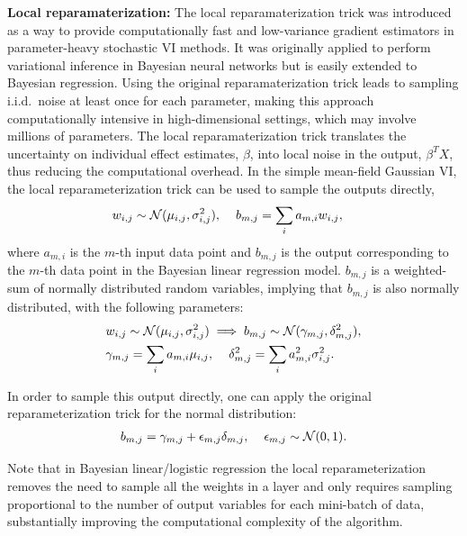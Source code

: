 \vspace{2mm}
\noindent \textbf{Local reparamaterization:} The local reparamaterization trick \cite{kingma2015variational} was introduced as a way to provide computationally fast and low-variance gradient estimators in parameter-heavy stochastic VI methods.
%
It was originally applied to perform variational inference in Bayesian neural networks but is easily extended to Bayesian regression.
%
Using the original reparamaterization trick \cite{kingma2013auto,blundell2015weight} leads to sampling i.i.d.\ noise at least once for each parameter, making this approach computationally intensive in high-dimensional settings, which may involve millions of parameters.
%
The local reparamaterization trick translates the uncertainty on individual effect estimates, $\beta$, into local noise in the output, $\beta^T X$, thus reducing the computational overhead.
%
In the simple mean-field Gaussian VI, the local reparameterization trick can be used to sample the outputs directly,
\begin{align}
   &w_{i,j} \sim \mathcal{N}(\mu_{i,j}, \sigma^2_{i,j}), \hspace{4mm} b_{m,j} =  \sum_{i} a_{m,i} w_{i,j},
\end{align}
where $a_{m,i}$ is the $m$-th input data point and $b_{m,j}$ is the output corresponding to the $m$-th data point in the Bayesian linear regression model.
%
$b_{m,j}$ is a weighted-sum of normally distributed random variables, implying that $b_{m,j}$ is also normally distributed, with the following parameters:
\begin{align}
    &w_{i,j} \sim \mathcal{N}(\mu_{i,j}, \sigma^2_{i,j}) \implies b_{m,j} \sim \mathcal{N}(\gamma_{m,j}, \delta^2_{m,j}), \nonumber \\
    &\gamma_{m,j} = \sum_{i}a_{m,i}\mu_{i,j} ,\hspace{4mm}\delta^2_{m,j} =  \sum_{i}a^2_{m,i}\sigma^2_{i,j}.
\end{align}

In order to sample this output directly, one can apply the original reparameterization trick for the normal distribution:
\begin{align}
   b_{m,j} =  \gamma_{m,j} + \epsilon_{m,j} \delta_{m,j}, \hspace{4mm} \epsilon_{m,j} \sim \mathcal{N}(0, 1).
\label{eq:reparam_local}
\end{align}

Note that in Bayesian linear/logistic regression the local reparameterization removes the need to sample all the weights in a layer and only requires sampling proportional to the number of output variables for each mini-batch of data, substantially improving the computational complexity of the algorithm.
%

